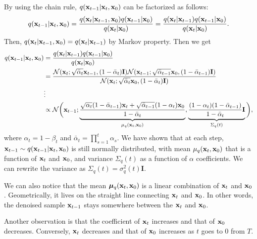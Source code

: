 By using the chain rule, $q({\mathbf{x}}_{t-1}|{\mathbf{x}}_t, {\mathbf{x}}_0)$ can be factorized as follows:
\begin{align*}
	q({\mathbf{x}}_{t-1}|{\mathbf{x}}_t, {\mathbf{x}}_0) = \frac{q({\mathbf{x}}_{t}|{\mathbf{x}}_{t-1}, {\mathbf{x}}_0)q({\mathbf{x}}_{t-1}|{\mathbf{x}}_0)}{q({\mathbf{x}}_{t}|{\mathbf{x}}_0)}=\frac{q({\mathbf{x}}_{t}|{\mathbf{x}}_{t-1})q({\mathbf{x}}_{t-1}|{\mathbf{x}}_0)}{q({\mathbf{x}}_{t}|{\mathbf{x}}_0)}.
\end{align*}
Then, $q({\mathbf{x}}_{t}|{\mathbf{x}}_{t-1}, {\mathbf{x}}_0) = q({\mathbf{x}}_{t}|{\mathbf{x}}_{t-1})$ by Markov property. Then we get
\begin{align}
	q({\mathbf{x}}_{t-1}|{\mathbf{x}}_t, {\mathbf{x}}_0) &=\frac{q({\mathbf{x}}_{t}|{\mathbf{x}}_{t-1})q({\mathbf{x}}_{t-1}|{\mathbf{x}}_0)}{q({\mathbf{x}}_{t}|{\mathbf{x}}_0)}\\
								 &= \frac{\mathcal{N}(\mathbf{x}_t; \sqrt{\bar{\alpha}_t} {\mathbf{x}}_{t-1}, (1-\bar{\alpha}_t)\mathbf{I})\mathcal{N}(\mathbf{x}_{t-1}; \sqrt{\bar{\alpha}_{t-1}} {\mathbf{x}}_{0}, (1-\bar{\alpha}_{t-1})\mathbf{I})}{\mathcal{N}(\mathbf{x}_t; \sqrt{\bar{\alpha}_t} {\mathbf{x}}_{0}, (1-\bar{\alpha}_t)\mathbf{I})}\\
								 & \vdots\\
								 &\propto \mathcal{N}\bigg({\mathbf{x}}_{t-1};\underbrace{\frac{\sqrt{{\alpha}_{t}}(1-\bar{\alpha}_{t-1}){\mathbf{x}}_t+\sqrt{\bar{\alpha}_{t-1}}(1-{\alpha}_{t}){\mathbf{x}}_0}{1-\bar{\alpha}_{t}}}_{\mu_q({\mathbf{x}}_t,{\mathbf{x}}_0)}, \underbrace{\frac{(1-{\alpha}_{t})(1-\bar{\alpha}_{t-1})}{1-\bar{\alpha}_{t}}\mathbf{I}}_{\Sigma_{q}(t)}\bigg),
	\label{eq:diffusion_kl_true_denoising}
\end{align}
where $\alpha_t = 1-\beta_t$ and $\bar{\alpha}_t = \prod_{s=1}^t \alpha_s$. We have shown that at each step, ${\mathbf{x}}_{t-1} \sim q({\mathbf{x}}_{t-1}|{\mathbf{x}}_t, {\mathbf{x}}_0)$ is still normally distributed, with mean $\mu_q({\mathbf{x}}_t,{\mathbf{x}}_0)$ that is a function of ${\mathbf{x}}_t$ and ${\mathbf{x}}_0$, and variance $\Sigma_q(t)$ as a function of $\alpha$ coefficients. We can rewrite the variance as $\Sigma_q(t) = \sigma^2_q(t)\mathbf{I}$.

We can also notice that the mean $\boldsymbol{\mu}_q({\mathbf{x}}_t,{\mathbf{x}}_0)$ is a linear combination of ${\mathbf{x}}_t$ and ${\mathbf{x}}_0$. Geometrically, it lives on the straight line connecting ${\mathbf{x}}_t$ and ${\mathbf{x}}_0$. In other words, the denoised sample ${\mathbf{x}}_{t-1}$ stays somewhere between the ${\mathbf{x}}_t$ and ${\mathbf{x}}_0$.

Another observation is that the coefficient of ${\mathbf{x}}_t$ increases and that of ${\mathbf{x}}_0$ decreases. Conversely, ${\mathbf{x}}_t$ decreases and that of ${\mathbf{x}}_0$ increases as $t$ goes to 0 from $T$.

